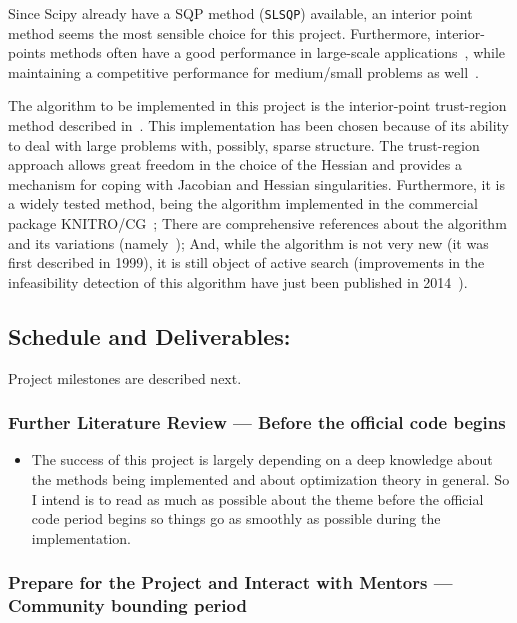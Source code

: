\documentclass[11pt]{article}
\begin{document}
Since Scipy already have a SQP method (\texttt{SLSQP}) available, an interior
point method seems the most sensible choice for this project. Furthermore,
interior-points methods often have a good performance in large-scale
applications~\cite[p.592]{nocedal2006numerical}, while maintaining a
competitive performance for medium/small problems as well~\cite{morales2003assessing}.

The algorithm to be implemented in this project is the interior-point
trust-region method described in~\cite{byrd1999interior}.
This implementation has been chosen because of its ability to deal with large
problems with, possibly, sparse structure. The trust-region approach allows
great freedom in the choice of the Hessian and provides a mechanism for coping
with Jacobian and Hessian singularities. Furthermore, it is a widely tested method,
being the algorithm implemented in the commercial package KNITRO/CG~\cite{byrd2006knitro};
There are comprehensive references about the algorithm and its variations
(namely~\cite{byrd1999interior, byrd2000trust, nocedal2006numerical}); And,
while the algorithm is not very new (it was first described in 1999),
it is still object of active search (improvements in the infeasibility detection
of this algorithm have just been published in 2014~\cite{nocedal2014interior}).


\subsection*{Schedule and Deliverables:}

Project milestones are described next. 

\subsubsection*{Further Literature Review --- Before the official code begins}

\begin{itemize}
\item
  The success of this project is largely depending on a deep knowledge about the methods being
  implemented and about optimization theory in general. So I intend is to read as much as possible
  about the theme before the official code period begins so things go as smoothly
  as possible during the implementation.
\end{itemize}

\subsubsection*{Prepare for  the Project and Interact with Mentors --- Community bounding period}
\end{document}
